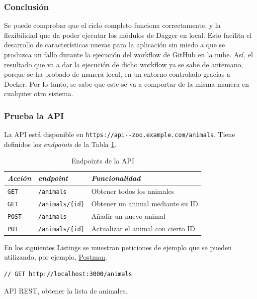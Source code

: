 \subsubsection*{Conclusión}

Se puede comprobar que el ciclo completo funciona correctamente, y la flexibilidad que da poder ejecutar los módulos de Dagger en local. Esto facilita el desarrollo de características nuevas para la aplicación sin miedo a que se produzca un fallo durante la ejecución del workflow de GitHub en la nube. Así, el resultado que va a dar la ejecución de dicho workflow ya se sabe de antemano, porque se ha probado de manera local, en un entorno controlado gracias a Docker. Por lo tanto, se sabe que este se va a comportar de la misma manera en cualquier otro sistema.

\subsubsection*{Prueba la API}

La API está disponible en \texttt{https://api--zoo.example.com/animals}. Tiene definidos los \textit{endpoints} de la Tabla \ref{tabla:endpoints}.

\begin{table}[h]
  \centering
  \begin{tabular}{|l|l|l|}
    \hline
    \textit{Acción} & \textit{endpoint} & \textit{Funcionalidad} \\ \hline
    \texttt{GET} & \texttt{/animals} & Obtener todos los animales \\ \hline
    \texttt{GET} & \texttt{/animals/\{id\}} & Obtener un animal mediante su ID \\ \hline
    \texttt{POST} & \texttt{/animals} & Añadir un nuevo animal \\ \hline
    \texttt{PUT} & \texttt{/animals/\{id\}} & Actualizar el animal con cierto ID \\ \hline
  \end{tabular}
  \caption{Endpoints de la API}
  \label{tabla:endpoints}
\end{table}

En los siguientes Listings se muestran peticiones de ejemplo que se pueden utilizando, por ejemplo, \href{https://www.postman.com/}{Postman}.

\begin{listing}[!ht]
  \begin{verbatim}
// GET http://localhost:3000/animals
  \end{verbatim}
  \caption{API REST, obtener la lista de animales.}
\end{listing}

